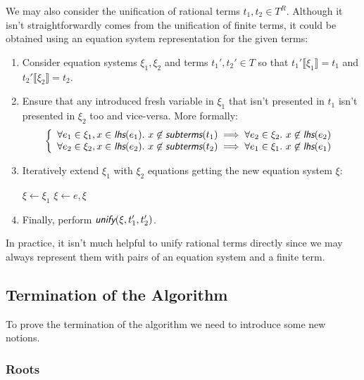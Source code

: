 We may also consider the unification of rational terms $t_1, t_2 \in T^R$. Although it isn't straightforwardly comes from the unification of finite terms, it could be obtained using an equation system representation for the given terms:
\begin{enumerate}
    \item Consider equation systems $\xi_1, \xi_2$ and terms $t_1', t_2' \in T$ so that $t_1' \llbracket\xi_1\rrbracket = t_1$ and $t_2' \llbracket\xi_2\rrbracket = t_2$.
    \item Ensure that any introduced fresh variable in $\xi_1$ that isn't presented in $t_1$ isn't presented in $\xi_2$ too and vice-versa. More formally:
    \begin{equation*}
        \left\{
        \begin{array}{l@{{}\implies{}}l}
            \forall e_1 \in \xi_1, x \in \lhs(e_1). ~ x \not\in \subterms(t_1) & \forall e_2 \in \xi_2. ~ x \not\in \lhs(e_2) \\
            \forall e_2 \in \xi_2, x \in \lhs(e_2). ~ x \not\in \subterms(t_2) & \forall e_1 \in \xi_1. ~ x \not\in \lhs(e_1) \\
        \end{array}
        \right.
    \end{equation*}
    \item Iteratively extend $\xi_1$ with $\xi_2$ equations getting the new equation system $\xi$:
    \begin{algorithmic}
        \State $\xi \gets \xi_1$
            \State $\xi \gets e, \xi$
        \EndFor
    \end{algorithmic}
    \item Finally, perform $\unify(\xi, t_1', t_2')$.
\end{enumerate}


In practice, it isn't much helpful to unify rational terms directly since we may always represent them with pairs of an equation system and a finite term.


\subsection{Termination of the Algorithm}

To prove the termination of the algorithm we need to introduce some new notions.


\subsubsection{Roots}

